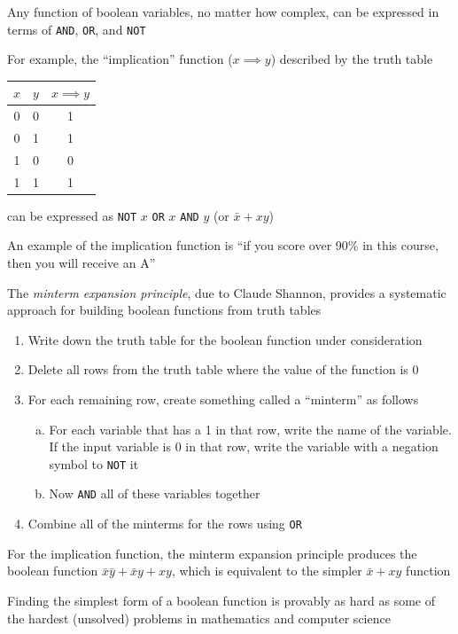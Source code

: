 \documentclass[8pt,a4paper,compress]{beamer}
\begin{document}
\begin{frame}[fragile]
Any function of boolean variables, no matter how complex, can be expressed in terms of \lstinline{AND}, \lstinline{OR}, and \lstinline{NOT}

\bigskip

For example, the ``implication'' function ($x \implies y$) described by the truth table
\begin{center}
\begin{tabular}{cc|c}
$x$ & $y$ & $x \implies y$ \\ \hline
0 & 0 & 1 \\
0 & 1 & 1 \\
1 & 0 & 0 \\
1 & 1 & 1
\end{tabular}
\end{center}
can be expressed as \lstinline{NOT} $x$ \lstinline{OR} $x$ \lstinline{AND} $y$ (or $\bar{x}+xy$)

\bigskip

An example of the implication function is ``if you score over 90\% in this course, then you will receive an A''
\end{frame}

\begin{frame}[fragile]
The \emph{minterm expansion principle}, due to Claude Shannon, provides a systematic approach for building boolean functions from truth tables

\begin{enumerate}
\item Write down the truth table for the boolean function under consideration

\item Delete all rows from the truth table where the value of the function is 0

\item For each remaining row, create something called a ``minterm'' as follows
\begin{enumerate}[a.]
\item For each variable that has a 1 in that row, write the name of the variable. If the input variable is 0 in that row, write the variable with a negation symbol to \lstinline{NOT} it

\item Now \lstinline{AND} all of these variables together
\end{enumerate}

\item Combine all of the minterms for the rows using \lstinline{OR}
\end{enumerate}

\bigskip

For the implication function, the minterm expansion principle produces the boolean function $\bar{x}\bar{y}+\bar{x}y+xy$, which is equivalent to the simpler $\bar{x}+xy$ function

\bigskip

Finding the simplest form of a boolean function is provably as hard as some of the hardest (unsolved) problems in mathematics and computer science
\end{frame}
\end{document}
